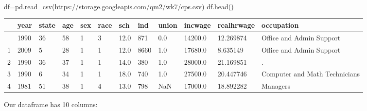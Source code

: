 \documentclass[
  letterpaper,
  DIV=11,
  numbers=noendperiod]{scrreprt}
\newenvironment{Shaded}{\begin{snugshade}}{\end{snugshade}}
\newcommand{\NormalTok}[1]{\textcolor[rgb]{0.00,0.23,0.31}{#1}}
\newcommand{\OperatorTok}[1]{\textcolor[rgb]{0.37,0.37,0.37}{#1}}
\newcommand{\StringTok}[1]{\textcolor[rgb]{0.13,0.47,0.30}{#1}}
\begin{document}
\begin{Shaded}
\begin{Highlighting}[]
\NormalTok{df}\OperatorTok{=}\NormalTok{pd.read\_csv(}\StringTok{\textquotesingle{}https://storage.googleapis.com/qm2/wk7/cps.csv\textquotesingle{}}\NormalTok{)}
\NormalTok{df.head()}
\end{Highlighting}
\end{Shaded}

\begin{longtable}[]{@{}llllllllllll@{}}
\toprule\noalign{}
& year & state & age & sex & race & sch & ind & union & incwage &
realhrwage & occupation \\
\midrule\noalign{}
\endhead
\bottomrule\noalign{}
\endlastfoot
0 & 1990 & 36 & 58 & 1 & 3 & 12.0 & 871 & 0.0 & 14200.0 & 12.269874 &
Office and Admin Support \\
1 & 2009 & 5 & 28 & 1 & 1 & 12.0 & 8660 & 1.0 & 17680.0 & 8.635149 &
Office and Admin Support \\
2 & 1990 & 36 & 37 & 1 & 1 & 14.0 & 380 & 1.0 & 28000.0 & 21.169851 &
. \\
3 & 1990 & 6 & 34 & 1 & 1 & 18.0 & 740 & 1.0 & 27500.0 & 20.447746 &
Computer and Math Technicians \\
4 & 1981 & 51 & 38 & 1 & 4 & 13.0 & 798 & NaN & 17000.0 & 18.892282 &
Managers \\
\end{longtable}

Our dataframe has 10 columns:
\end{document}
